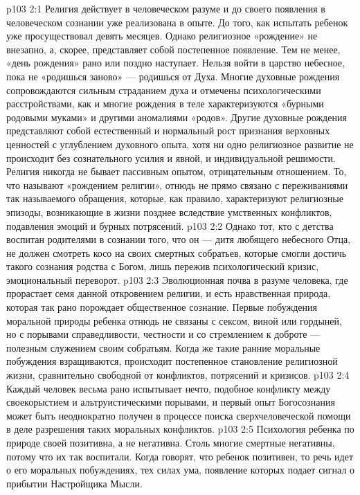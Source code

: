 \vs p103 2:1 Религия действует в человеческом разуме и до своего появления в человеческом сознании уже реализована в опыте. До того, как испытать  ребенок уже просуществовал девять месяцев. Однако религиозное «рождение» не внезапно, а, скорее, представляет собой постепенное появление. Тем не менее, «день рождения» рано или поздно наступает. Нельзя войти в царство небесное, пока не «родишься заново» --- родишься от Духа. Многие духовные рождения сопровождаются сильным страданием духа и отмечены психологическими расстройствами, как и многие рождения в теле характеризуются «бурными родовыми муками» и другими аномалиями «родов». Другие духовные рождения представляют собой естественный и нормальный рост признания верховных ценностей с углублением духовного опыта, хотя ни одно религиозное развитие не происходит без сознательного усилия и явной, и индивидуальной решимости. Религия никогда не бывает пассивным опытом, отрицательным отношением. То, что называют «рождением религии», отнюдь не прямо связано с переживаниями так называемого обращения, которые, как правило, характеризуют религиозные эпизоды, возникающие в жизни позднее вследствие умственных конфликтов, подавления эмоций и бурных потрясений.
\vs p103 2:2 Однако тот, кто с детства воспитан родителями в сознании того, что он --- дитя любящего небесного Отца, не должен смотреть косо на своих смертных собратьев, которые смогли достичь такого сознания родства с Богом, лишь пережив психологический кризис, эмоциональный переворот.
\vs p103 2:3 Эволюционная почва в разуме человека, где прорастает семя данной откровением религии, и есть нравственная природа, которая так рано порождает общественное сознание. Первые побуждения моральной природы ребенка отнюдь не связаны с сексом, виной или гордыней, но с порывами справедливости, честности и со стремлением к доброте --- полезным служением своим собратьям. Когда же такие ранние моральные побуждения взращиваются, происходит постепенное становление религиозной жизни, сравнительно свободной от конфликтов, потрясений и кризисов.
\vs p103 2:4 Каждый человек весьма рано испытывает нечто, подобное конфликту между своекорыстием и альтруистическими порывами, и первый опыт Богосознания может быть неоднократно получен в процессе поиска сверхчеловеческой помощи в деле разрешения таких моральных конфликтов.
\vs p103 2:5 Психология ребенка по природе своей позитивна, а не негативна. Столь многие смертные негативны, потому что их так воспитали. Когда говорят, что ребенок позитивен, то речь идет о его моральных побуждениях, тех силах ума, появление которых подает сигнал о прибытии Настройщика Мысли.

